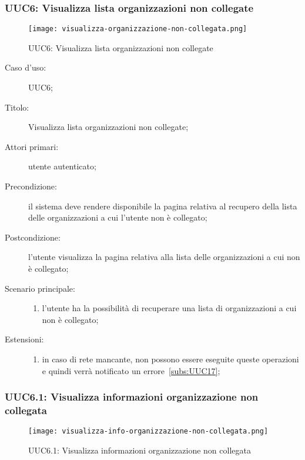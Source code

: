 \documentclass[../../../analisi-dei-requisiti.tex]{subfiles}
\begin{document}
\subsubsection{UUC6: Visualizza lista organizzazioni non collegate}%
\label{subs:UUC6}

\begin{figure}[H]
  \centering
  \texttt{[image: visualizza-organizzazione-non-collegata.png]}
  \caption{UUC6: Visualizza lista organizzazioni non collegate}%
  \label{fig:UUC6}
\end{figure}

\begin{description}
  \item[Caso d'uso:] UUC6;
  \item[Titolo:] Visualizza lista organizzazioni non collegate;
  \item[Attori primari:] utente autenticato;
  \item[Precondizione:] il sistema deve rendere disponibile la pagina relativa al recupero della lista delle organizzazioni a cui l'utente non è collegato;
  \item[Postcondizione:] l'utente visualizza la pagina relativa alla lista delle organizzazioni a cui non è collegato;
  \item[Scenario principale:]
        \begin{enumerate}
          \item l'utente ha la possibilità di recuperare una lista di organizzazioni a cui non è collegato;
        \end{enumerate}
  \item[Estensioni:]
        \begin{enumerate}
          \item in caso di rete mancante, non possono essere eseguite queste operazioni e quindi verrà notificato un errore~\ref{subs:UUC17};
        \end{enumerate}
\end{description}

\subsubsection{UUC6.1: Visualizza informazioni organizzazione non collegata}%
\label{subs:UUC6.1}

\begin{figure}[H]
  \centering
  \texttt{[image: visualizza-info-organizzazione-non-collegata.png]}
  \caption{UUC6.1: Visualizza informazioni organizzazione non collegata}%
  \label{fig:UUC6.1}
\end{figure}
\end{document}
